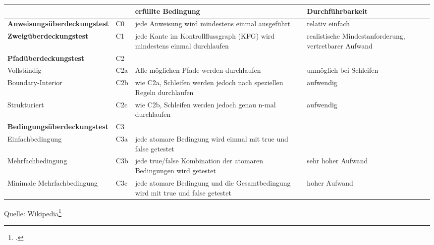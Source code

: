 \documentclass{lehramt-informatik-haupt}
\begin{document}
{
\footnotesize
\noindent
\begin{tabular}{llL{4cm}L{3cm}}
&
&
\textbf{erfüllte Bedingung} &
\textbf{Durchführbarkeit}
\\

\hline

%

\textbf{Anweisungsüberdeckungstest}
&
C0 &
jede Anweisung wird mindestens einmal ausgeführt &
relativ einfach \\

\hline

%

\textbf{Zweigüberdeckungstest} &
C1 &
jede Kante im Kontrollflussgraph (KFG) wird mindestens einmal durchlaufen &
realistische Mindestanforderung, vertretbarer Aufwand \\

\hline

%

\textbf{Pfadüberdeckungstest} &
C2 &
&
\\

Vollständig &
C2a &
Alle möglichen Pfade werden durchlaufen &
unmöglich bei Schleifen \\

Boundary-Interior &
C2b &
wie C2a, Schleifen werden jedoch nach speziellen Regeln durchlaufen &
aufwendig \\

Strukturiert &
C2c &
wie C2b, Schleifen werden jedoch genau n-mal durchlaufen &
aufwendig \\

\hline

%

\textbf{Bedingungsüberdeckungstest} &
C3 &
&
\\

Einfachbedingung &
C3a &
jede atomare Bedingung wird einmal mit true und false getestet &
\\

Mehrfachbedingung &
C3b &
jede true/false Kombination der atomaren Bedingungen wird getestet &
sehr hoher Aufwand \\

Minimale Mehrfachbedingung &
C3c &
jede atomare Bedingung und die Gesamtbedingung wird mit true und false getestet &
hoher Aufwand\\
\end{tabular}

Quelle: Wikipedia\footcite{wiki:kontrollfluss-test}
}

%
\end{document}
